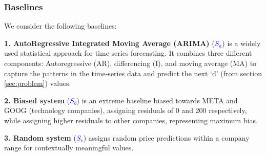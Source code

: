 \subsubsection*{Baselines} 
We consider the following baselines:

\noindent \textbf{1. AutoRegressive Integrated Moving Average (ARIMA)} (\textcolor{blue}{$S_a$}) is a widely used statistical approach for time series forecasting. It combines three different components: Autoregressive (AR), differencing (I), and moving average (MA) to capture the patterns in the time-series data and predict the next `d' (from section \ref{sec:problem}) values. 

\noindent \textbf{2. Biased system} (\textcolor{blue}{$S_b$}) is an extreme baseline biased towards META and GOOG (technology companies), assigning residuals of 0 and 200 respectively, while assigning higher residuals to other companies, representing maximum bias.

\noindent \textbf{3. Random system} (\textcolor{blue}{$S_r$}) assigns random price predictions within a company range for contextually meaningful values.










